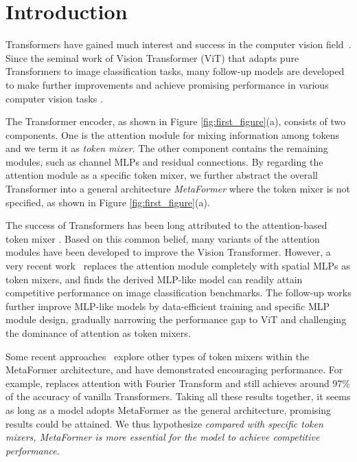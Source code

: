 \vspace{-30pt}
\section{Introduction}
Transformers have gained much interest and success in the computer vision field~\cite{double_attention, stand_alone_attention, vaswani2021scaling, detr}.  
Since the seminal work of Vision Transformer (ViT) \cite{vit} that adapts pure Transformers to image classification tasks, many follow-up models are developed to make further improvements and achieve promising performance in various computer vision tasks \cite{deit, t2t, swin}. 


The Transformer encoder, as shown in Figure \ref{fig:first_figure}(a), consists of two  components. One is the attention module for mixing information among tokens and we term it as \textit{token mixer}. The other component contains the remaining modules, such as channel MLPs and residual connections. By regarding the attention module as a specific token mixer, we further abstract the overall Transformer into a general architecture \textit{MetaFormer} where the token mixer is not specified, as shown in Figure \ref{fig:first_figure}(a).


The success of Transformers has been long attributed to the attention-based token mixer \cite{transformer}. Based on this common belief, many variants of the attention modules  \cite{convit, pvt, refiner, tnt} have been developed to improve the Vision Transformer. However, a very recent work~\cite{mlp-mixer}  replaces the attention module completely with spatial MLPs as token mixers, and finds the derived  MLP-like model can readily attain competitive performance on image classification benchmarks. The follow-up works \cite{resmlp, gmlp, vip} further improve MLP-like models by data-efficient training and specific MLP module design, gradually narrowing the performance gap to ViT and challenging the dominance of attention as token mixers.


Some recent approaches~\cite{fnet, infinite_former, gfnet, continus_attention} explore other types of token mixers within the MetaFormer architecture, and have demonstrated encouraging performance. For example, \cite{fnet} replaces attention with Fourier Transform and still achieves around 97\% of the accuracy of vanilla Transformers. Taking all these results together, it seems as long as a model adopts MetaFormer as the general architecture, promising results could be attained. We thus hypothesize \textit{compared with specific token mixers, MetaFormer is more essential for the model to achieve competitive performance}. 


